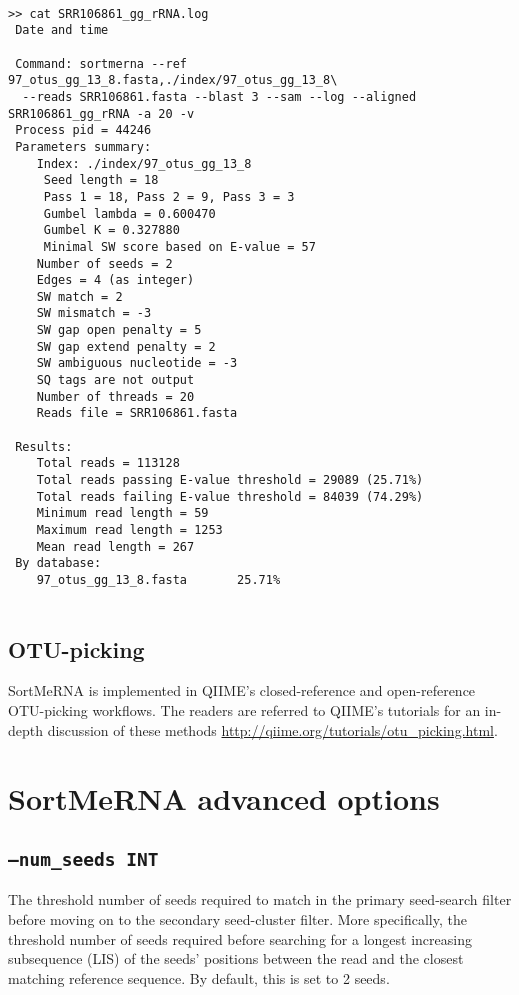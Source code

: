 \documentclass[10pt,a4paper]{article}
\begin{document}
\begin{Verbatim}[fontsize=\footnotesize]

>> cat SRR106861_gg_rRNA.log 
 Date and time

 Command: sortmerna --ref 97_otus_gg_13_8.fasta,./index/97_otus_gg_13_8\
  --reads SRR106861.fasta --blast 3 --sam --log --aligned SRR106861_gg_rRNA -a 20 -v 
 Process pid = 44246
 Parameters summary:
    Index: ./index/97_otus_gg_13_8
     Seed length = 18
     Pass 1 = 18, Pass 2 = 9, Pass 3 = 3
     Gumbel lambda = 0.600470
     Gumbel K = 0.327880
     Minimal SW score based on E-value = 57
    Number of seeds = 2
    Edges = 4 (as integer)
    SW match = 2
    SW mismatch = -3
    SW gap open penalty = 5
    SW gap extend penalty = 2
    SW ambiguous nucleotide = -3
    SQ tags are not output
    Number of threads = 20
    Reads file = SRR106861.fasta

 Results:
    Total reads = 113128
    Total reads passing E-value threshold = 29089 (25.71%)
    Total reads failing E-value threshold = 84039 (74.29%)
    Minimum read length = 59
    Maximum read length = 1253
    Mean read length = 267
 By database:
    97_otus_gg_13_8.fasta		25.71%
    
\end{Verbatim}

\newpage
\subsection{OTU-picking}

SortMeRNA is implemented in QIIME's closed-reference and open-reference OTU-picking workflows.
The readers are referred to QIIME's tutorials for an in-depth discussion of these methods
\url{http://qiime.org/tutorials/otu_picking.html}.

\section{SortMeRNA advanced options}

\subsection*{{\tt --num\_seeds INT}}
The threshold number of seeds required to match in the primary seed-search filter before 
moving on to the secondary seed-cluster filter. More specifically, the threshold number of 
seeds required before searching for a longest increasing subsequence (LIS) of the seeds' positions
between the read and the closest matching reference sequence. By default, this is set to 2 seeds. 
\end{document}
